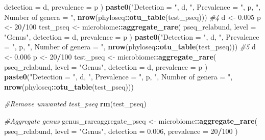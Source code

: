 \documentclass[
]{book}
\newenvironment{Shaded}{\begin{snugshade}}{\end{snugshade}}
\newcommand{\AttributeTok}[1]{\textcolor[rgb]{0.13,0.29,0.53}{#1}}
\newcommand{\CommentTok}[1]{\textcolor[rgb]{0.56,0.35,0.01}{\textit{#1}}}
\newcommand{\DecValTok}[1]{\textcolor[rgb]{0.00,0.00,0.81}{#1}}
\newcommand{\FloatTok}[1]{\textcolor[rgb]{0.00,0.00,0.81}{#1}}
\newcommand{\FunctionTok}[1]{\textcolor[rgb]{0.13,0.29,0.53}{\textbf{#1}}}
\newcommand{\NormalTok}[1]{#1}
\newcommand{\OtherTok}[1]{\textcolor[rgb]{0.56,0.35,0.01}{#1}}
\newcommand{\SpecialCharTok}[1]{\textcolor[rgb]{0.81,0.36,0.00}{\textbf{#1}}}
\newcommand{\StringTok}[1]{\textcolor[rgb]{0.31,0.60,0.02}{#1}}
\begin{document}
\begin{Shaded}
\begin{Highlighting}[]
  \AttributeTok{detection =}\NormalTok{ d, }\AttributeTok{prevalence =}\NormalTok{ p}
\NormalTok{)}
\FunctionTok{paste0}\NormalTok{(}\StringTok{"Detection = "}\NormalTok{, d, }\StringTok{", Prevalence = "}\NormalTok{, p,}
       \StringTok{", Number of genera = "}\NormalTok{, }\FunctionTok{nrow}\NormalTok{(phyloseq}\SpecialCharTok{::}\FunctionTok{otu\_table}\NormalTok{(test\_pseq)))}
\CommentTok{\#4}
\NormalTok{d }\OtherTok{\textless{}{-}} \FloatTok{0.005}
\NormalTok{p }\OtherTok{\textless{}{-}} \DecValTok{20}\SpecialCharTok{/}\DecValTok{100}
\NormalTok{test\_pseq }\OtherTok{\textless{}{-}}\NormalTok{ microbiome}\SpecialCharTok{::}\FunctionTok{aggregate\_rare}\NormalTok{(}
\NormalTok{  pseq\_relabund, }\AttributeTok{level =} \StringTok{"Genus"}\NormalTok{,}
  \AttributeTok{detection =}\NormalTok{ d, }\AttributeTok{prevalence =}\NormalTok{ p}
\NormalTok{)}
\FunctionTok{paste0}\NormalTok{(}\StringTok{"Detection = "}\NormalTok{, d, }\StringTok{", Prevalence = "}\NormalTok{, p,}
       \StringTok{", Number of genera = "}\NormalTok{, }\FunctionTok{nrow}\NormalTok{(phyloseq}\SpecialCharTok{::}\FunctionTok{otu\_table}\NormalTok{(test\_pseq)))}
\CommentTok{\#5}
\NormalTok{d }\OtherTok{\textless{}{-}} \FloatTok{0.006}
\NormalTok{p }\OtherTok{\textless{}{-}} \DecValTok{20}\SpecialCharTok{/}\DecValTok{100}
\NormalTok{test\_pseq }\OtherTok{\textless{}{-}}\NormalTok{ microbiome}\SpecialCharTok{::}\FunctionTok{aggregate\_rare}\NormalTok{(}
\NormalTok{  pseq\_relabund, }\AttributeTok{level =} \StringTok{"Genus"}\NormalTok{,}
  \AttributeTok{detection =}\NormalTok{ d, }\AttributeTok{prevalence =}\NormalTok{ p}
\NormalTok{)}
\FunctionTok{paste0}\NormalTok{(}\StringTok{"Detection = "}\NormalTok{, d, }\StringTok{", Prevalence = "}\NormalTok{, p,}
       \StringTok{", Number of genera = "}\NormalTok{, }\FunctionTok{nrow}\NormalTok{(phyloseq}\SpecialCharTok{::}\FunctionTok{otu\_table}\NormalTok{(test\_pseq)))}

\CommentTok{\#Remove unwanted test\_pseq}
\FunctionTok{rm}\NormalTok{(test\_pseq)}
\end{Highlighting}
\end{Shaded}

\begin{Shaded}
\begin{Highlighting}[]
\CommentTok{\#Aggregate genus}
\NormalTok{genus\_rareaggregate\_pseq }\OtherTok{\textless{}{-}}\NormalTok{ microbiome}\SpecialCharTok{::}\FunctionTok{aggregate\_rare}\NormalTok{(}
\NormalTok{  pseq\_relabund, }\AttributeTok{level =} \StringTok{"Genus"}\NormalTok{,}
  \AttributeTok{detection =} \FloatTok{0.006}\NormalTok{, }\AttributeTok{prevalence =} \DecValTok{20}\SpecialCharTok{/}\DecValTok{100}
\NormalTok{)}
\end{Highlighting}
\end{Shaded}
\end{document}
